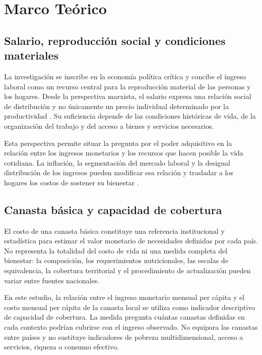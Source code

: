 \section{Marco Teórico}

\subsection{Salario, reproducción social y condiciones materiales}

La investigación se inscribe en la economía política crítica y concibe el ingreso laboral como un recurso central para la reproducción material de las personas y los hogares. Desde la perspectiva marxista, el salario expresa una relación social de distribución y no únicamente un precio individual determinado por la productividad \parencite{MarxElCapital2008, DuranSilva2022}. Su suficiencia depende de las condiciones históricas de vida, de la organización del trabajo y del acceso a bienes y servicios necesarios.

Esta perspectiva permite situar la pregunta por el poder adquisitivo en la relación entre los ingresos monetarios y los recursos que hacen posible la vida cotidiana. La inflación, la segmentación del mercado laboral y la desigual distribución de los ingresos pueden modificar esa relación y trasladar a los hogares los costos de sostener su bienestar \parencite{DuranKremerman2024, cepalPanoramaSocialAmerica2025}.

\subsection{Canasta básica y capacidad de cobertura}

El costo de una canasta básica constituye una referencia institucional y estadística para estimar el valor monetario de necesidades definidas por cada país. No representa la totalidad del costo de vida ni una medida completa del bienestar: la composición, los requerimientos nutricionales, las escalas de equivalencia, la cobertura territorial y el procedimiento de actualización pueden variar entre fuentes nacionales.

En este estudio, la relación entre el ingreso monetario mensual per cápita y el costo mensual per cápita de la canasta local se utiliza como indicador descriptivo de capacidad de cobertura. La medida pregunta cuántas canastas definidas en cada contexto podrían cubrirse con el ingreso observado. No equipara las canastas entre países y no sustituye indicadores de pobreza multidimensional, acceso a servicios, riqueza o consumo efectivo.

